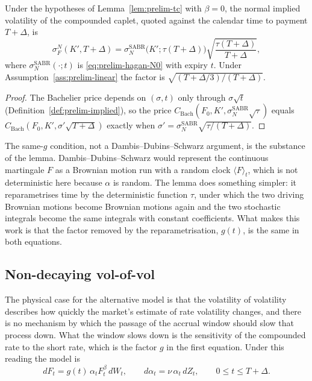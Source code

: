\documentclass[../../../main.tex]{subfiles}
\begin{document}
\begin{corollary}\label{cor:prelim-quoted}
Under the hypotheses of Lemma~\ref{lem:prelim-tc} with $\beta=0$, the normal implied volatility of the compounded caplet, quoted against the calendar time to payment $T+\Delta$, is
\begin{equation}\label{eq:prelim-quoted}
\sigma^{N}_{F}(K',T+\Delta)=\sigma_N^{\mathrm{SABR}}\big(K';\tau(T+\Delta)\big)\sqrt{\frac{\tau(T+\Delta)}{T+\Delta}},
\end{equation}
where $\sigma_N^{\mathrm{SABR}}(\cdot;t)$ is \eqref{eq:prelim-hagan-N0} with expiry $t$. Under Assumption~\ref{ass:prelim-linear} the factor is $\sqrt{(T+\Delta/3)/(T+\Delta)}$.
\end{corollary}

\begin{proof}
The Bachelier price depends on $(\sigma,t)$ only through $\sigma\sqrt t$ (Definition~\ref{def:prelim-implied}), so the price $C_{\mathrm{Bach}}(F_0,K',\sigma_N^{\mathrm{SABR}}\sqrt{\tau})$ equals $C_{\mathrm{Bach}}(F_0,K',\sigma'\sqrt{T+\Delta})$ exactly when $\sigma'=\sigma_N^{\mathrm{SABR}}\sqrt{\tau/(T+\Delta)}$.
\end{proof}

The same-$g$ condition, not a Dambis--Dubins--Schwarz argument, is the substance of the lemma. Dambis--Dubins--Schwarz \cite[Thm.~3.4.6]{karatzas1991} would represent the continuous martingale $F$ as a Brownian motion run with a random clock $\langle F\rangle_t$, which is not deterministic here because $\alpha$ is random. The lemma does something simpler: it reparametrises time by the deterministic function $\tau$, under which the two driving Brownian motions become Brownian motions again and the two stochastic integrals become the same integrals with constant coefficients. What makes this work is that the factor removed by the reparametrisation, $g(t)$, is the same in both equations.

\subsection{Non-decaying vol-of-vol}

The physical case for the alternative model is that the volatility of volatility describes how quickly the market's estimate of rate volatility changes, and there is no mechanism by which the passage of the accrual window should slow that process down. What the window slows down is the sensitivity of the compounded rate to the short rate, which is the factor $g$ in the first equation. Under this reading the model is
\begin{equation}\label{eq:prelim-sabr-novol}
dF_t=g(t)\,\alpha_tF_t^{\beta}\,dW_t,\qquad d\alpha_t=\nu\,\alpha_t\,dZ_t,\qquad 0\le t\le T+\Delta .
\end{equation}
\end{document}

